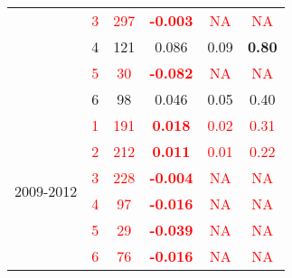 \begin{table}
\begin{tabular}{rrrrrr}
    \multicolumn{1}{c}{} & \multicolumn{1}{c}{\textcolor{red}{3}} & \multicolumn{1}{c}{\textcolor{red}{297}} & \multicolumn{1}{c}{\textcolor{red}{\textbf{-0.003}}} & \multicolumn{1}{c}{\textcolor{red}{NA}} & \multicolumn{1}{c}{\textcolor{red}{NA}} \\
    \multicolumn{1}{c}{} & \multicolumn{1}{c}{4} & \multicolumn{1}{c}{121} & \multicolumn{1}{c}{0.086 } & \multicolumn{1}{c}{0.09 } & \multicolumn{1}{c}{\textbf{0.80}} \\
    \multicolumn{1}{c}{} & \multicolumn{1}{c}{\textcolor{red}{5}} & \multicolumn{1}{c}{\textcolor{red}{30}} & \multicolumn{1}{c}{\textcolor{red}{\textbf{-0.082}}} & \multicolumn{1}{c}{\textcolor{red}{NA}} & \multicolumn{1}{c}{\textcolor{red}{NA}} \\
    \multicolumn{1}{c}{} & \multicolumn{1}{c}{6} & \multicolumn{1}{c}{98} & \multicolumn{1}{c}{0.046 } & \multicolumn{1}{c}{0.05 } & \multicolumn{1}{c}{0.40 } \\\midrule
    \multicolumn{1}{c}{\multirow{6}[2]{*}{\begin{sideways}2009-2012\end{sideways}}} & \multicolumn{1}{c}{\textcolor{red}{1}} & \multicolumn{1}{c}{\textcolor{red}{191}} & \multicolumn{1}{c}{\textcolor{red}{\textbf{0.018}}} & \multicolumn{1}{c}{\textcolor{red}{0.02}} & \multicolumn{1}{c}{\textcolor{red}{0.31}} \\
    \multicolumn{1}{c}{} & \multicolumn{1}{c}{\textcolor{red}{2}} & \multicolumn{1}{c}{\textcolor{red}{212}} & \multicolumn{1}{c}{\textcolor{red}{\textbf{0.011}}} & \multicolumn{1}{c}{\textcolor{red}{0.01 }} & \multicolumn{1}{c}{\textcolor{red}{0.22}} \\
    \multicolumn{1}{c}{} & \multicolumn{1}{c}{\textcolor{red}{3}} & \multicolumn{1}{c}{\textcolor{red}{228}} & \multicolumn{1}{c}{\textcolor{red}{\textbf{-0.004}}} & \multicolumn{1}{c}{\textcolor{red}{NA}} & \multicolumn{1}{c}{\textcolor{red}{NA}} \\
    \multicolumn{1}{c}{} & \multicolumn{1}{c}{\textcolor{red}{4}} & \multicolumn{1}{c}{\textcolor{red}{97}} & \multicolumn{1}{c}{\textcolor{red}{\textbf{-0.016}}} & \multicolumn{1}{c}{\textcolor{red}{NA}} & \multicolumn{1}{c}{\textcolor{red}{NA}} \\
    \multicolumn{1}{c}{} & \multicolumn{1}{c}{\textcolor{red}{5}} & \multicolumn{1}{c}{\textcolor{red}{29}} & \multicolumn{1}{c}{\textcolor{red}{\textbf{-0.039}}} & \multicolumn{1}{c}{\textcolor{red}{NA}} & \multicolumn{1}{c}{\textcolor{red}{NA}} \\
    \multicolumn{1}{c}{} & \multicolumn{1}{c}{\textcolor{red}{6}} & \multicolumn{1}{c}{\textcolor{red}{76}} & \multicolumn{1}{c}{\textcolor{red}{\textbf{-0.016}}} & \multicolumn{1}{c}{\textcolor{red}{NA}} & \multicolumn{1}{c}{\textcolor{red}{NA}} \\
    \bottomrule
    \end{tabular}%
  \label{tab:NO3TVPHPA}%
\end{table}%
